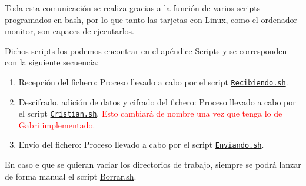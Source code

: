 Toda esta comunicación se realiza gracias a la función de varios scripts programados en bash, por lo que tanto las tarjetas con Linux, como el ordenador monitor, son capaces de ejecutarlos.

Dichos scripts los podemos encontrar en el apéndice \hyperlink{Scripts}{Scripts} y se corresponden con la siguiente secuencia:
\begin{enumerate}
	\item Recepción del fichero: Proceso llevado a cabo por el script \hyperlink{ScriptRecibiendo}{\texttt{Recibiendo.sh}}.
	\item Descifrado, adición de datos y cifrado del fichero: Proceso llevado a cabo por el script \hyperlink{ScriptCristian}{\texttt{Cristian.sh}}. \textcolor{red}{Esto cambiará de nombre una vez que tenga lo de Gabri implementado.}
	\item Envío del fichero: Proceso llevado a cabo por el script \hyperlink{ScriptEnviando}{\texttt{Enviando.sh}}.
\end{enumerate}

En caso e que se quieran vaciar los directorios de trabajo, siempre se podrá lanzar de forma manual el script \hyperlink{ScriptBorrar}{Borrar.sh}.